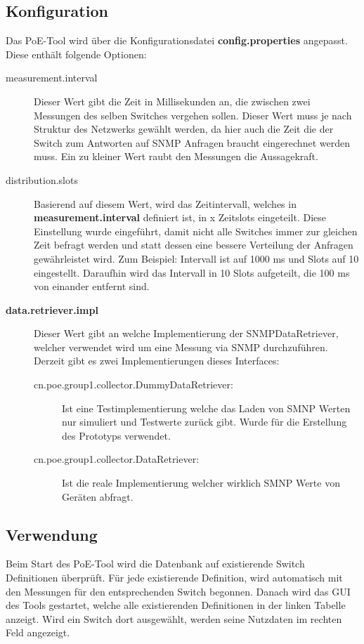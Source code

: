 \subsection{Konfiguration}

Das PoE-Tool wird über die Konfigurationsdatei \textbf{config.properties} angepasst. Diese enthält folgende Optionen:

\begin{description}
  \item [measurement.interval] Dieser Wert gibt die Zeit in Millisekunden an, die zwischen zwei Messungen des selben Switches vergehen sollen. Dieser Wert muss je nach Struktur des Netzwerks gewählt werden, da hier auch die Zeit die der Switch zum Antworten auf SNMP Anfragen braucht eingerechnet werden muss. Ein zu kleiner Wert raubt den Messungen die Aussagekraft.
  \item [distribution.slots] Basierend auf diesem Wert, wird das Zeitintervall, welches in \textbf{measurement.interval} definiert ist, in x Zeitslots eingeteilt. Diese Einstellung wurde eingeführt, damit nicht alle Switches immer zur gleichen Zeit befragt werden und statt dessen eine bessere Verteilung der Anfragen gewährleistet wird. Zum Beispiel: Intervall ist auf 1000 ms und Slots auf 10 eingestellt. Daraufhin wird das Intervall in 10 Slots aufgeteilt, die 100 ms von einander entfernt sind.
  \item [\textbf{data.retriever.impl}] Dieser Wert gibt an welche Implementierung der SNMPDataRetriever, welcher verwendet wird um eine Messung via SNMP durchzuführen. Derzeit gibt es zwei Implementierungen dieses Interfaces:
  \begin{description}
   \item[cn.poe.group1.collector.DummyDataRetriever:] Ist eine Testimplementierung welche das Laden von SMNP Werten nur simuliert und Testwerte zurück gibt. Wurde für die Erstellung des Prototyps verwendet.
   \item[cn.poe.group1.collector.DataRetriever:] Ist die reale Implementierung welcher wirklich SMNP Werte von Geräten abfragt.
  \end{description}
\end{description}

\subsection{Verwendung}
Beim Start des PoE-Tool wird die Datenbank auf existierende Switch Definitionen überprüft. Für jede existierende Definition, wird automatisch mit den Messungen für den entsprechenden Switch begonnen. Danach wird das GUI des Tools gestartet, welche alle existierenden Definitionen in der linken Tabelle anzeigt. Wird ein Switch dort ausgewählt, werden seine Nutzdaten im rechten Feld angezeigt.

